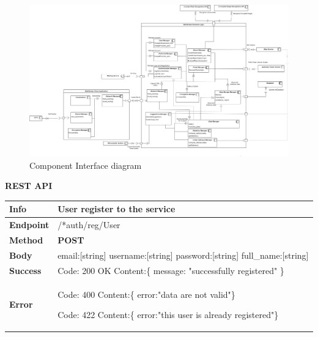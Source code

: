 \begin{figure}[H]
\centering
\advance\leftskip-6cm
          \includegraphics[width=1.5\textwidth,left]{Images/Component_interface.png}
        \caption{Component Interface diagram}
\end{figure}
\newpage
\textbf{REST API}
\begin{table}[H]
\begin{tabular}{|l|p{}|}
\hline
\textbf{Info}             & User register to the service                                                                           \\ \hline
\textbf{Endpoint}    &  /*auth/reg/User\\ \hline
\textbf{Method}         &   \textbf{POST}                                                                            \\ \hline

\textbf{Body}  &   email:[string] \newline
                   username:[string] \newline
                   password:[string] \newline 
                   full\_name:[string]
                    \\ \hline
                    
\textbf{Success} &  Code: 200 OK \newline
                    Content:\{\newline 
                    message: "successfully registered"\newline 
                    \}\\ \hline
\textbf{Error} &  Code: 400 \newline
                  Content:\{\newline
                  error:"data are not valid"\newline\}\newline
                  
                  Code: 422 \newline
                  Content:\{\newline
                  error:"this user is already registered"\newline\}\\\hline

\end{tabular}
\end{table}



